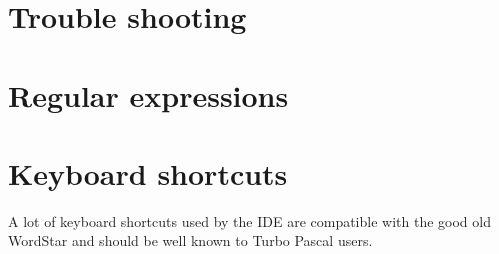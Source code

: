 \section{Trouble shooting}

\section{Regular expressions}
\label{ide:regexpr}

\section{Keyboard shortcuts}
\label{ide:keyshortcuts}

A lot of keyboard shortcuts used by the IDE are compatible with the
good old WordStar and should be well known to Turbo Pascal users.

